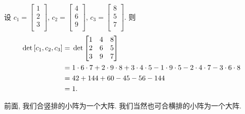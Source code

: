 \documentclass[../libro.tex]{subfiles}
\begin{document}
\begin{example}
    设
    \(c_1 =
        \begin{bmatrix}
            1 \\ 2 \\ 3 \\
    \end{bmatrix}\),
    \(c_2 =
        \begin{bmatrix}
            4 \\ 6 \\ 9 \\
    \end{bmatrix}\),
    \(c_3 =
        \begin{bmatrix}
            8 \\ 5 \\ 7 \\
    \end{bmatrix}\).
    则
    \begin{align*}
        \det {[c_1, c_2, c_3]}
        = {} &
        \det {
            \begin{bmatrix}
                1 & 4 & 8 \\
                2 & 6 & 5 \\
                3 & 9 & 7 \\
        \end{bmatrix}}
        \\
        = {} &
        1 \cdot 6 \cdot 7 + 2 \cdot 9 \cdot 8 + 3 \cdot 4 \cdot 5
        - 1 \cdot 9 \cdot 5 - 2 \cdot 4 \cdot 7 - 3 \cdot 6 \cdot 8
        \\
        = {} &
        42 + 144 + 60 - 45 - 56 - 144
        \\
        = {} & 1.
        \qedhere
    \end{align*}
\end{example}

前面, 我们合竖排的小阵为一个大阵.
我们当然也可合横排的小阵为一个大阵.
\end{document}
